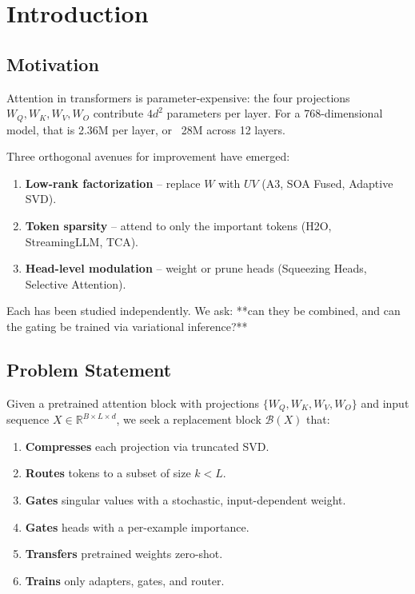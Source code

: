 \section{Introduction}

\subsection{Motivation}

Attention in transformers is parameter-expensive: the four projections 
$W_Q, W_K, W_V, W_O$ contribute $4d^2$ parameters per layer. For a 
768-dimensional model, that is 2.36M per layer, or ~28M across 12 layers.

Three orthogonal avenues for improvement have emerged:

\begin{enumerate}
\item \textbf{Low-rank factorization} -- replace $W$ with $UV$ (A3, SOA Fused,
  Adaptive SVD).
\item \textbf{Token sparsity} -- attend to only the important tokens (H2O,
  StreamingLLM, TCA).
\item \textbf{Head-level modulation} -- weight or prune heads (Squeezing Heads,
  Selective Attention).

\end{enumerate}
Each has been studied independently. We ask: **can they be combined, and 
can the gating be trained via variational inference?**

\subsection{Problem Statement}

Given a pretrained attention block with projections $\{W_Q, W_K, W_V, W_O\}$ 
and input sequence $X \in \mathbb{R}^{B \times L \times d}$, we seek a 
replacement block $\mathcal{B}(X)$ that:

\begin{enumerate}
\item \textbf{Compresses} each projection via truncated SVD.
\item \textbf{Routes} tokens to a subset of size $k < L$.
\item \textbf{Gates} singular values with a stochastic, input-dependent weight.
\item \textbf{Gates} heads with a per-example importance.
\item \textbf{Transfers} pretrained weights zero-shot.
\item \textbf{Trains} only adapters, gates, and router.

\end{enumerate}
